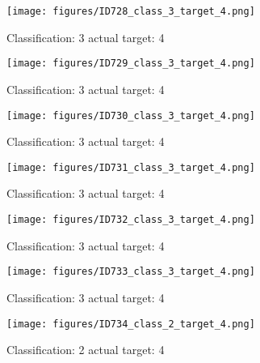 \begin{figure}[h!]
\begin{center}
\texttt{[image: figures/ID728\_class\_3\_target\_4.png]}
\end{center}
\caption{ Classification: 3 actual target: 4}
\label{fig:ID728_class_3_target_4}
\end{figure}
\begin{figure}[h!]
\begin{center}
\texttt{[image: figures/ID729\_class\_3\_target\_4.png]}
\end{center}
\caption{ Classification: 3 actual target: 4}
\label{fig:ID729_class_3_target_4}
\end{figure}
\begin{figure}[h!]
\begin{center}
\texttt{[image: figures/ID730\_class\_3\_target\_4.png]}
\end{center}
\caption{ Classification: 3 actual target: 4}
\label{fig:ID730_class_3_target_4}
\end{figure}
\begin{figure}[h!]
\begin{center}
\texttt{[image: figures/ID731\_class\_3\_target\_4.png]}
\end{center}
\caption{ Classification: 3 actual target: 4}
\label{fig:ID731_class_3_target_4}
\end{figure}
\begin{figure}[h!]
\begin{center}
\texttt{[image: figures/ID732\_class\_3\_target\_4.png]}
\end{center}
\caption{ Classification: 3 actual target: 4}
\label{fig:ID732_class_3_target_4}
\end{figure}
\begin{figure}[h!]
\begin{center}
\texttt{[image: figures/ID733\_class\_3\_target\_4.png]}
\end{center}
\caption{ Classification: 3 actual target: 4}
\label{fig:ID733_class_3_target_4}
\end{figure}
\begin{figure}[h!]
\begin{center}
\texttt{[image: figures/ID734\_class\_2\_target\_4.png]}
\end{center}
\caption{ Classification: 2 actual target: 4}
\label{fig:ID734_class_2_target_4}
\end{figure}
